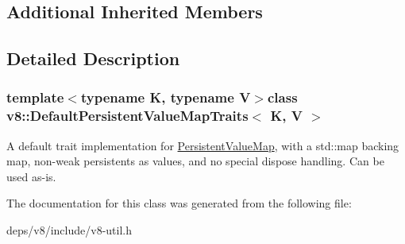 \subsection*{Additional Inherited Members}


\subsection{Detailed Description}
\subsubsection*{template$<$typename K, typename V$>$class v8\+::\+Default\+Persistent\+Value\+Map\+Traits$<$ K, V $>$}

A default trait implementation for \hyperlink{classv8_1_1_persistent_value_map}{Persistent\+Value\+Map}, with a std\+::map backing map, non-\/weak persistents as values, and no special dispose handling. Can be used as-\/is. 

The documentation for this class was generated from the following file\+:\begin{DoxyCompactItemize}
\item 
deps/v8/include/v8-\/util.\+h\end{DoxyCompactItemize}

